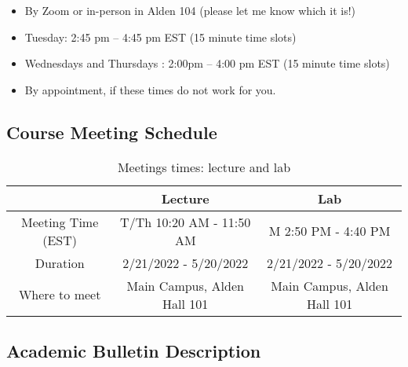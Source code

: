 \documentclass[11pt]{article} %
\begin{document}
\color{red}

\begin{itemize}
  \itemsep 0em
  \item By Zoom or in-person in Alden 104 (please let me know which it is!)
  \item Tuesday: 2:45 pm  -- 4:45 pm EST (15 minute time slots)
  \item Wednesdays and Thursdays : 2:00pm  -- 4:00 pm EST (15 minute time slots)
  \item By appointment, if these times do not work for you.
\end{itemize}

\color{black}





\subsection*{Course Meeting Schedule}

\begin{table}
	\begin{center}
		\caption{Meetings times: lecture and lab}
		\label{tab:meeting}
			\begin{tabular}{|c|c|c|}
			\hline
			&Lecture & Lab \\
			\hline
			Meeting Time (EST) &T/Th 10:20 AM - 11:50 AM & M 2:50 PM - 4:40 PM\\
			Duration &2/21/2022 - 5/20/2022 & 2/21/2022 - 5/20/2022\\
			Where to meet &Main Campus, Alden Hall 101 & Main Campus, Alden Hall 101\\
			\hline
		\end{tabular}
	\end{center}
\end{table}






\subsection*{\textbf{Academic Bulletin Description}}
\end{document}
